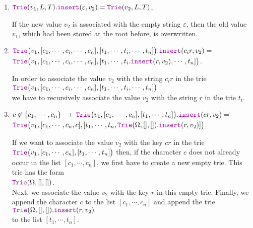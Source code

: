 \begin{enumerate}
\item $\mytt{Trie}(v_1,L,T).\mytt{insert}(\varepsilon, v_2) = \mytt{Trie}(v_2,L,T)$,
  
      If the new value $v_2$ is associated with the empty string $\varepsilon$, then the old value
      $v_1$, which had been stored at the root before, is overwritten.
\item $\mytt{Trie}\bigl(v_1,[c_1,\cdots,c_i,\cdots,c_n], [t_1,\cdots,t_i,\cdots,t_n]\bigr).\mytt{insert}(c_ir,v_2) =$ \\[0.2cm]
      \hspace*{1.3cm}  
      $\mytt{Trie}\bigl(v_1,[c_1,\cdots,c_i,\cdots,c_n], [t_1,\cdots,t_i.\mytt{insert}(r,v_2),\cdots,t_n]\bigr)$.

      In order to associate the value $v_2$ with the string $c_ir$ in the trie
      \\[0.2cm]
      \hspace*{1.3cm}
      $\mytt{Trie}\bigl(v_1,[c_1,\cdots,c_i,\cdots,c_n], [t_1,\cdots,t_i,\cdots,t_n]\bigr)$ 
      \\[0.2cm]
      we have to recursively associate the value $v_2$ with the string $r$ in the trie $t_i$.
\item $c \not\in\{c_1,\cdots,c_n\} \;\rightarrow\;\mytt{Trie}\bigl(v_1,[c_1,\cdots,c_n], [t_1,\cdots,t_n]\bigr).\mytt{insert}(cr,v_2) =$ \\[0.2cm]
      \hspace*{1.3cm}  
      $\mytt{Trie}\bigl(v_1,[c_1,\cdots,c_n,c], [t_1,\cdots,t_n,\mytt{Trie}(\Omega,[],[]).\mytt{insert}(r,v_2)]\bigr)$.
      
      If we want to associate the value $v_2$ with the key $cr$ in the trie
      $\mytt{Trie}\bigl(v_1,[c_1,\cdots,c_n], [t_1,\cdots,t_n]\bigr)$ then, if the character $c$
      does not already occur in the list $[c_1,\cdots,c_n]$, we first have to create a new empty trie.
      This trie has the form \\[0.2cm]
      \hspace*{1.3cm} $\mytt{Trie}(\Omega, [], [])$. \\[0.2cm]
      Next, we associate the value $v_2$ with the key $r$ in this empty trie.  Finally,
      we append the character $c$ to the list $[c_1,\cdots,c_n]$ and append the trie
        \\[0.2cm] 
      \hspace*{1.3cm}
      $\mytt{Trie}(\Omega, [], []).\mytt{insert}(r,v_2)$ 
      \\[0.2cm]
      to the list $[t_1,\cdots,t_n]$.
\end{enumerate}


